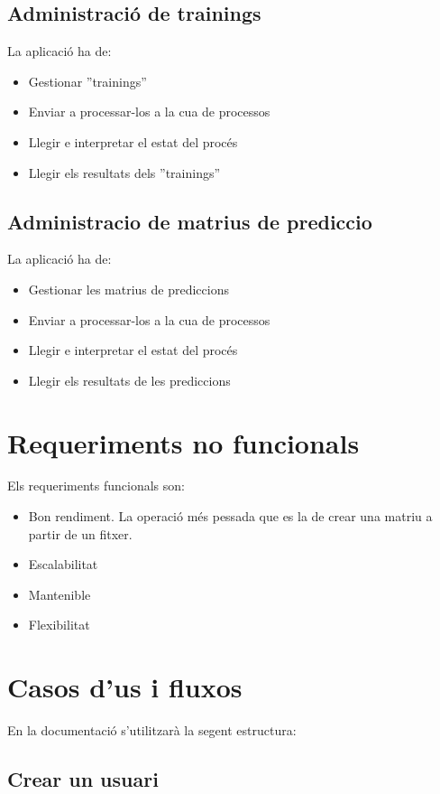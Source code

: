 \subsection{Administraci\'{o} de trainings}
La aplicaci\'{o} ha de:
\begin{itemize}
	\item Gestionar ''trainings'' 
	\item Enviar a processar-los a la cua de processos
	\item Llegir e interpretar el estat del proc\'{e}s 
	\item Llegir els resultats dels ''trainings''
\end{itemize}

\subsection{Administracio de matrius de prediccio}
La aplicaci\'{o} ha de:
\begin{itemize}
	\item Gestionar les matrius de prediccions 
	\item Enviar a processar-los a la cua de processos
	\item Llegir e interpretar el estat del proc\'{e}s 
	\item Llegir els resultats de les prediccions
\end{itemize}

\section{Requeriments no funcionals}
Els requeriments funcionals son:
\begin{itemize}
\item Bon rendiment. La operaci\'{o} m\'{e}s pessada que es la de crear una matriu a partir de un fitxer.
\item Escalabilitat
\item Mantenible
\item Flexibilitat
\end{itemize}


\section{Casos d'us i fluxos}
En la documentaci\'{o} s'utilitzar\`{a} la segent estructura:\\
\subsection{Crear un usuari}
\begin{usecase}
\end{usecase}



